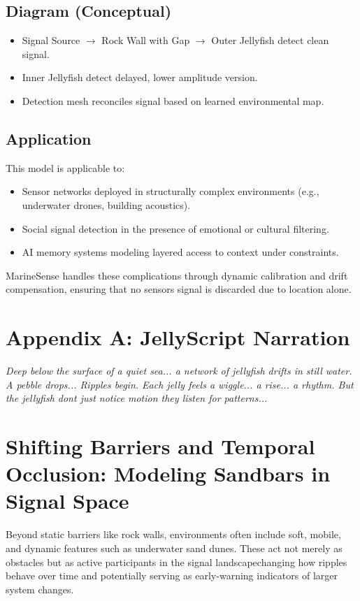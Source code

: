 \documentclass[11pt]{article}
\begin{document}
\subsection{Diagram (Conceptual)}
\begin{itemize}
  \item Signal Source $\rightarrow$ Rock Wall with Gap $\rightarrow$ Outer Jellyfish detect clean signal.
  \item Inner Jellyfish detect delayed, lower amplitude version.
  \item Detection mesh reconciles signal based on learned environmental map.
\end{itemize}

\subsection{Application}
This model is applicable to:
\begin{itemize}
  \item Sensor networks deployed in structurally complex environments (e.g., underwater drones, building acoustics).
  \item Social signal detection in the presence of emotional or cultural filtering.
  \item AI memory systems modeling layered access to context under constraints.
\end{itemize}

MarineSense handles these complications through dynamic calibration and drift compensation, ensuring that no sensors signal is discarded due to location alone.

\section*{Appendix A: JellyScript Narration}
\textit{Deep below the surface of a quiet sea... a network of jellyfish drifts in still water. A pebble drops... Ripples begin. Each jelly feels a wiggle... a rise... a rhythm. But the jellyfish dont just notice motion  they listen for patterns...}


\section{Shifting Barriers and Temporal Occlusion: Modeling Sandbars in Signal Space}
Beyond static barriers like rock walls, environments often include soft, mobile, and dynamic features such as underwater sand dunes. These act not merely as obstacles but as active participants in the signal landscapechanging how ripples behave over time and potentially serving as early-warning indicators of larger system changes.
\end{document}
